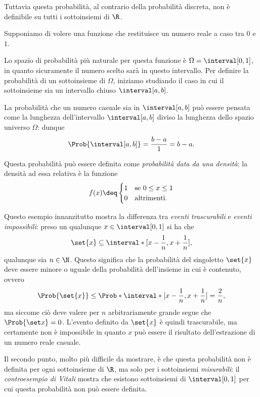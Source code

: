 Tuttavia questa probabilità, al contrario della probabilità discreta, non è definibile su tutti i sottoinsiemi di $\R$.
\begin{example}
    Supponiamo di volere una funzione che restituisce un numero reale a caso tra $0$ e $1$.

    Lo spazio di probabilità più naturale per questa funzione è $\Omega = \interval[{0, 1}]$, in quanto sicuramente il numero scelto sarà in questo intervallo. Per definire la probabilità di un sottoinsieme di $\Omega$, iniziamo studiando il caso in cui il sottoinsieme sia un intervallo chiuso $\interval[{a, b}]$.

    La probabilità che un numero casuale sia in $\interval[{a, b}]$ può essere pensata come la lunghezza dell'intervallo $\interval[{a, b}]$ diviso la lunghezza dello spazio universo $\Omega$: dunque \[
        \Prob{\interval[{a, b}]} = \frac{b - a}{1} = b - a.    
    \]

    Questa probabilità può essere definita come \emph{probabilità data da una densità}: la densità ad essa relativa è la funzione \[
        f(x) \deq \begin{cases}
            1 &\text{se } 0 \leq x \leq 1\\
            0 &\text{altrimenti}.
        \end{cases}    
    \]

    Questo esempio innanzitutto mostra la differenza tra \emph{eventi trascurabili} e \emph{eventi impossibili}: preso un qualunque $x \in \interval[{0, 1}]$ si ha che \[
        \set{x} \subseteq \interval*[{x - \frac1n, x + \frac{1}{n}}],    
    \] qualunque sia $n \in \N$. Questo significa che la probabilità del singoletto $\set{x}$ deve essere minore o uguale della probabilità dell'insieme in cui è contenuto, ovvero \[
        \Prob{\set{x}} \leq \Prob*{\interval*[{x - \frac1n, x + \frac1n}]} = \frac2n,    
    \] ma siccome ciò deve valere per $n$ arbitrariamente grande segue che $\Prob{\set x} = 0$. L'evento definito da $\set{x}$ è quindi trascurabile, ma certamente non è impossibile in quanto $x$ può essere il risultato dell'estrazione di un numero reale casuale.

    Il secondo punto, molto più difficile da mostrare, è che questa probabilità non è definita per ogni sottoinsieme di $\R$, ma solo per i sottoinsiemi \emph{misurabili}: il \emph{controesempio di Vitali} mostra che esistono sottoinsiemi di $\interval[{0, 1}]$ per cui questa probabilità non può essere definita. 
\end{example} 

